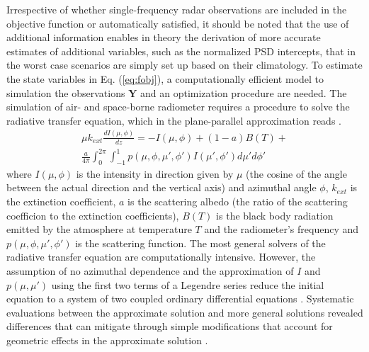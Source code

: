 \documentclass[10pt]{ietbook}
\begin{document}
Irrespective of whether single-frequency radar observations are included in the objective function or automatically satisfied, it should
be noted that the use of additional information enables in theory the derivation of more accurate estimates of additional variables, such
as the normalized PSD intercepts, that in the worst case scenarios are simply set up based on their climatology. To estimate the state
variables in Eq. (\ref{eq:fobj}), a computationally efficient model to simulation the observations $\mathbf{Y}$ and an optimization procedure
are needed.  The simulation of air- and space-borne radiometer requires a procedure to solve the radiative transfer equation, which
in the plane-parallel approximation reads \cite{kummerow1993}.
\begin{multline}\label{eq:rte}
\mu k_{ext}\frac {dI(\mu,\phi)}{dz}=-I(\mu,\phi) + (1-a)B(T)+\\
\frac {a} {4\pi} \int_0^{2\pi}\int_{-1}^{1}p(\mu,\phi,\mu',\phi')I(\mu',\phi')d\mu'd\phi'
\end{multline}
where $I(\mu,\phi)$ is the intensity in direction given by $\mu$ (the cosine of the angle between the actual direction and 
the vertical axis) and azimuthal angle $\phi$, $k_{ext}$ is the extinction coefficient, $a$ is the scattering albedo (the ratio
of the scattering coefficion to the extinction coefficients), $B(T)$ is the black body radiation emitted by the atmosphere at 
temperature $T$ and the radiometer's frequency and $p(\mu,\phi,\mu',\phi')$ is the scattering function. The most general solvers
of the radiative transfer equation are computationally intensive.  However, the assumption of no azimuthal dependence and the
approximation of $I$ and $p(\mu,\mu')$ using the first two terms of a Legendre series \cite{kummerow1993} reduce the initial equation
to a system of two coupled ordinary differential equations \cite{kummerow1993}.  Systematic evaluations between the approximate solution
and more general solutions revealed differences that can mitigate through simple modifications that account for geometric effects in
the approximate solution \cite{liu1996}.
\end{document}
